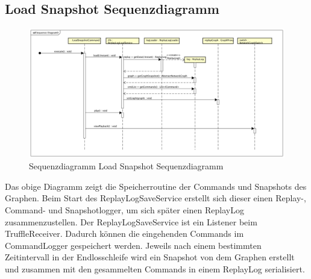 \subsection{Load Snapshot Sequenzdiagramm}
\begin{figure}
  \centering
  \includegraphics[width=\textwidth]{../diagramimages/sd_loadsnapshot.png}
  \caption[Sequenzdiagramm Load Snapshot Sequenzdiagramm]{Sequenzdiagramm Load Snapshot Sequenzdiagramm}
\end{figure}
\FloatBarrier

 Das obige Diagramm zeigt die Speicherroutine der Commands und Snapshots des Graphen. Beim Start des ReplayLogSaveService erstellt sich dieser einen Replay-, Command- und Snapshotlogger, um sich später einen ReplayLog zusammenzustellen. Der ReplayLogSaveService ist ein Listener beim TruffleReceiver. Dadurch können die eingehenden Commands im CommandLogger gespeichert werden. Jeweils nach einem bestimmten Zeitintervall in der Endlosschleife wird ein Snapshot von dem Graphen erstellt und zusammen mit den gesammelten Commands in einem ReplayLog serialisiert. 